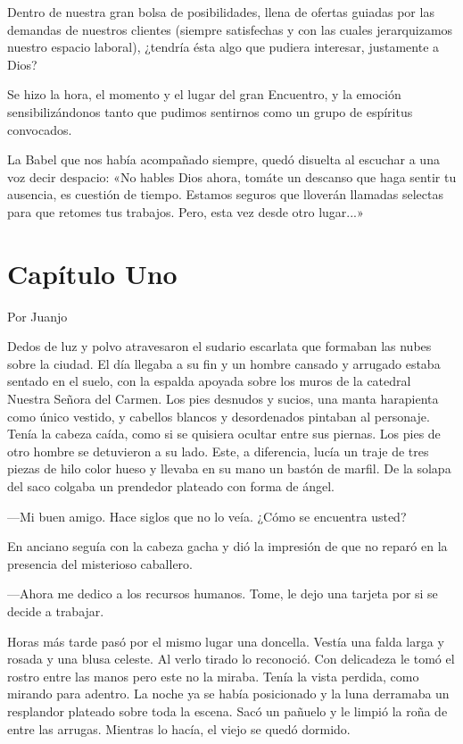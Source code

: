 \documentclass[11pt,twoside,openright,a5paper]{book}
\begin{document}
Dentro de nuestra gran bolsa de posibilidades, llena de ofertas guiadas por las demandas de nuestros clientes (siempre satisfechas y con las cuales jerarquizamos nuestro espacio laboral), ¿tendría ésta algo que pudiera interesar, justamente a Dios?

Se hizo la hora, el momento y el lugar del gran Encuentro, y la emoción sensibilizándonos tanto que pudimos sentirnos como un grupo de espíritus convocados.

La Babel que nos había acompañado siempre, quedó disuelta al escuchar a una voz decir despacio: «No hables Dios ahora, tomáte un descanso que haga sentir tu ausencia, es cuestión de tiempo. Estamos seguros que lloverán llamadas selectas para que retomes tus trabajos. Pero, esta vez desde otro lugar...»

\section*{Capítulo Uno}
                                                                                                       \begin{flushright}Por Juanjo\end{flushright}

Dedos de luz y polvo atravesaron el sudario escarlata que formaban las nubes sobre la ciudad. El día llegaba a su fin y un hombre cansado y arrugado estaba sentado en el suelo, con la espalda apoyada sobre los muros de la catedral Nuestra Señora del Carmen. Los pies desnudos y sucios, una manta harapienta como único vestido,  y cabellos blancos y desordenados pintaban al personaje. Tenía la cabeza caída, como si se quisiera ocultar entre sus piernas. Los pies de otro hombre se detuvieron a su lado. Este, a diferencia, lucía un traje de tres piezas de hilo color hueso y llevaba en su mano un bastón de marfil. De la solapa del saco colgaba un prendedor plateado con forma de ángel.

---Mi buen amigo. Hace siglos que no lo veía. ¿Cómo se encuentra usted?

En anciano seguía con la cabeza gacha y dió la impresión de que no reparó en la presencia del misterioso caballero.

---Ahora me dedico a los recursos humanos. Tome, le dejo una tarjeta por si se decide a trabajar.


Horas más tarde pasó por el mismo lugar una doncella. Vestía una falda larga y rosada y una blusa celeste. Al verlo tirado lo reconoció. Con delicadeza le tomó el rostro entre las manos pero este no la miraba. Tenía la vista perdida, como mirando para adentro.
La noche ya se había posicionado y la luna derramaba un resplandor plateado sobre toda la escena. Sacó un pañuelo y le limpió la roña de entre las arrugas. Mientras lo hacía, el viejo se quedó dormido.
\end{document}
